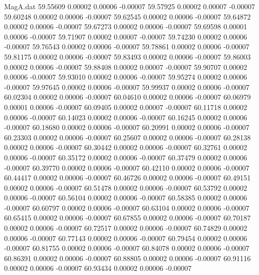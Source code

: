 \begin{filecontents}{MagA.dat}
  59.55609    0.00002    0.00006   -0.00007
  59.57925    0.00002    0.00007   -0.00007
  59.60248    0.00002    0.00006   -0.00007
  59.62545    0.00002    0.00006   -0.00007
  59.64872    0.00002    0.00006   -0.00007
  59.67273    0.00002    0.00006   -0.00007
  59.69598    0.00001    0.00006   -0.00007
  59.71907    0.00002    0.00007   -0.00007
  59.74230    0.00002    0.00006   -0.00007
  59.76543    0.00002    0.00006   -0.00007
  59.78861    0.00002    0.00006   -0.00007
  59.81175    0.00002    0.00006   -0.00007
  59.83493    0.00002    0.00006   -0.00007
  59.86003    0.00002    0.00006   -0.00007
  59.88408    0.00002    0.00007   -0.00007
  59.90707    0.00002    0.00006   -0.00007
  59.93010    0.00002    0.00006   -0.00007
  59.95274    0.00002    0.00006   -0.00007
  59.97645    0.00002    0.00006   -0.00007
  59.99937    0.00002    0.00006   -0.00007
  60.02304    0.00002    0.00006   -0.00007
  60.04610    0.00002    0.00006   -0.00007
  60.06979    0.00001    0.00006   -0.00007
  60.09405    0.00002    0.00007   -0.00007
  60.11718    0.00002    0.00006   -0.00007
  60.14023    0.00002    0.00006   -0.00007
  60.16245    0.00002    0.00006   -0.00007
  60.18680    0.00002    0.00006   -0.00007
  60.20991    0.00002    0.00006   -0.00007
  60.23303    0.00002    0.00006   -0.00007
  60.25607    0.00002    0.00006   -0.00007
  60.28138    0.00002    0.00006   -0.00007
  60.30442    0.00002    0.00006   -0.00007
  60.32761    0.00002    0.00006   -0.00007
  60.35172    0.00002    0.00006   -0.00007
  60.37479    0.00002    0.00006   -0.00007
  60.39770    0.00002    0.00006   -0.00007
  60.42110    0.00002    0.00006   -0.00007
  60.44417    0.00002    0.00006   -0.00007
  60.46726    0.00002    0.00006   -0.00007
  60.49151    0.00002    0.00006   -0.00007
  60.51478    0.00002    0.00006   -0.00007
  60.53792    0.00002    0.00006   -0.00007
  60.56104    0.00002    0.00006   -0.00007
  60.58385    0.00002    0.00006   -0.00007
  60.60797    0.00002    0.00006   -0.00007
  60.63104    0.00002    0.00006   -0.00007
  60.65415    0.00002    0.00006   -0.00007
  60.67855    0.00002    0.00006   -0.00007
  60.70187    0.00002    0.00006   -0.00007
  60.72517    0.00002    0.00006   -0.00007
  60.74829    0.00002    0.00006   -0.00007
  60.77143    0.00002    0.00006   -0.00007
  60.79454    0.00002    0.00006   -0.00007
  60.81755    0.00002    0.00006   -0.00007
  60.84078    0.00002    0.00006   -0.00007
  60.86391    0.00002    0.00006   -0.00007
  60.88805    0.00002    0.00006   -0.00007
  60.91116    0.00002    0.00006   -0.00007
  60.93434    0.00002    0.00006   -0.00007

\end{filecontents}
